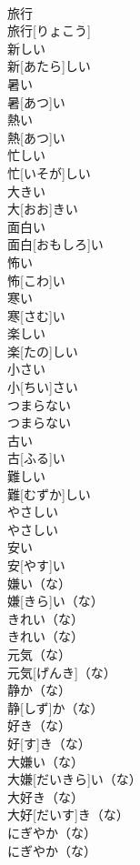 \documentclass[8pt]{extreport}
\begin{document}
\begin{CJK}{UTF8}{min}
\\	旅行	
\\	旅行[りょこう]
\\	新しい	
\\	新[あたら]しい
\\	暑い	
\\	暑[あつ]い
\\	熱い	
\\	熱[あつ]い
\\	忙しい	
\\	忙[いそが]しい
\\	大きい	
\\	大[おお]きい
\\	面白い	
\\	面白[おもしろ]い
\\	怖い	
\\	怖[こわ]い
\\	寒い	
\\	寒[さむ]い
\\	楽しい	
\\	楽[たの]しい
\\	小さい	
\\	小[ちい]さい
\\	つまらない	
\\	つまらない
\\	古い	
\\	古[ふる]い
\\	難しい	
\\	難[むずか]しい
\\	やさしい	
\\	やさしい
\\	安い	
\\	安[やす]い
\\	嫌い（な）	
\\	嫌[きら]い（な）
\\	きれい（な）	
\\	きれい（な）
\\	元気（な）	
\\	元気[げんき]（な）
\\	静か（な）	
\\	静[しず]か（な）
\\	好き（な）	
\\	好[す]き（な）
\\	大嫌い（な）	
\\	大嫌[だいきら]い（な）
\\	大好き（な）	
\\	大好[だいす]き（な）
\\	にぎやか（な）	
\\	にぎやか（な）

\end{CJK}
\end{document}
